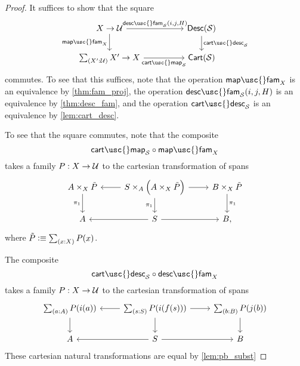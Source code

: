 \begin{proof}
It suffices to show that the square
\begin{equation*}
\begin{tikzcd}[column sep=huge]
X\to \UU \arrow[r,"{\mathsf{desc\usc{}fam}_{\mathcal{S}}(i,j,H)}"] \arrow[d,swap,"\mathsf{map\usc{}fam}_X"] & \mathsf{Desc}(\mathcal{S}) \arrow[d,"\mathsf{cart\usc{}desc}_{\mathcal{S}}"] \\
\sm{X':\UU}X'\to X \arrow[r,swap,"\mathsf{cart\usc{}map}_{\mathcal{S}}"] & \mathsf{Cart}(\mathcal{S})
\end{tikzcd}
\end{equation*}
commutes. To see that this suffices, note that the operation $\mathsf{map\usc{}fam}_X$ is an equivalence by \cref{thm:fam_proj}, the operation $\mathsf{desc\usc{}fam}_{\mathcal{S}}(i,j,H)$ is an equivalence by \cref{thm:desc_fam}, and the operation $\mathsf{cart\usc{}desc}_{\mathcal{S}}$ is an equivalence by \cref{lem:cart_desc}.

To see that the square commutes, note that the composite
\begin{equation*}
\mathsf{cart\usc{}map}_{\mathcal{S}}\circ \mathsf{map\usc{}fam}_X
\end{equation*}
takes a family $P:X\to \mathcal{U}$ to the cartesian transformation of spans
\begin{equation*}
\begin{tikzcd}
A\times_X\tilde{P} \arrow[d,swap,"\pi_1"] & S\times_A\Big(A\times_X\tilde{P}\Big) \arrow[l] \arrow[r] \arrow[d,swap,"\pi_1"] & B\times_X\tilde{P} \arrow[d,"\pi_1"] \\
A & S \arrow[l] \arrow[r] & B,
\end{tikzcd}
\end{equation*}
where $\tilde{P}\defeq\sm{x:X}P(x)$.

The composite 
\begin{equation*}
\mathsf{cart\usc{}desc}_{\mathcal{S}}\circ \mathsf{desc\usc{}fam}_X
\end{equation*}
takes a family $P:X\to \mathcal{U}$ to the cartesian transformation of spans
\begin{equation*}
\begin{tikzcd}
\sm{a:A}P(i(a)) \arrow[d] & \sm{s:S}P(i(f(s))) \arrow[l] \arrow[r] \arrow[d] & \sm{b:B}P(j(b)) \arrow[d] \\
A & S \arrow[l] \arrow[r] & B
\end{tikzcd}
\end{equation*}
These cartesian natural transformations are equal by \cref{lem:pb_subst}
\end{proof}

